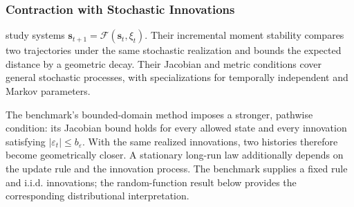 \subsubsection{Contraction with Stochastic Innovations}

\citet{kawano2024contraction} study systems
$\mathbf{s}_{t+1}=\mathcal F(\mathbf{s}_t,\xi_t)$.
Their incremental moment stability compares two trajectories under the same
stochastic realization and bounds the expected distance by a geometric
decay. Their Jacobian and metric conditions cover general stochastic
processes, with specializations for temporally independent and Markov
parameters.

The benchmark's bounded-domain method imposes a stronger, pathwise
condition: its Jacobian bound holds for every allowed state and every
innovation satisfying $|\varepsilon_t|\leq b_\varepsilon$.
With the same realized innovations, two histories therefore become
geometrically closer. A stationary long-run law additionally depends on
the update rule and the innovation process. The benchmark supplies a fixed
rule and i.i.d. innovations; the random-function result below provides
the corresponding distributional interpretation.
